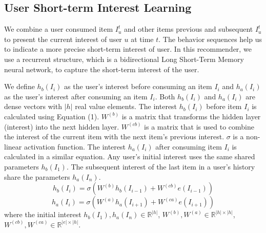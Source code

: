 \documentclass[runningheads]{llncs}
\begin{document}
\subsection{User Short-term Interest Learning}
We combine a user consumed item $I_{u}^{t}$ and other items previous and subsequent $I_{u}^{t}$ to present the current interest of user $u$ at time $t$. The behavior sequences help us to indicate a more precise short-term interest of user. In this recommender, we use a recurrent structure, which is a bidirectional Long Short-Term Memory neural network, to capture the short-term interest of the user.

We define $h_{b}(I_{i})$ as the user's interest before consuming an item $I_{i}$ and $h_{a}(I_{i})$ as the user's interest after consuming an item $I_{i}$. Both $h_{b}(I_{i})$ and $h_{a}(I_{i})$ are dense vectors with $|h|$ real value elements. The interest $h_{b}(I_{i})$ before item $I_{i}$ is calculated using Equation (1). $W^{(b)}$ is a matrix that transforms the hidden layer (interest) into the next hidden layer. $W^{(cb)}$ is a matrix that is used to combine the interest of the current item with the next item's previous interest. $\sigma $ is a non-linear activation function. The interest $h_{a}(I_{i})$ after consuming item $I_{i}$ is calculated in a similar equation. Any user's initial interest uses the same shared parameters $h_{b}(I_{1})$. The subsequent interest of the last item in a user's history share the parameters $h_{a}(I_{n})$.
\begin{equation}
h_{b}(I_{i})=\sigma (W^{(b)}h_{b}(I_{i-1})+W^{(cb)}e(I_{i-1}))
\end{equation}
\begin{equation}
h_{a}(I_{i})=\sigma (W^{(a)}h_{a}(I_{i+1})+W^{(ca)}e(I_{i+1}))
\end{equation}
where the initial interest $h_{b}(I_{1}),h_{a}(I_{n})\in \mathbb{R}^{|h|}$, $W^{(b)},W^{(a)}\in \mathbb{R}^{|h|\times |h|}$, $W^{(cb)},W^{(ca)}\in \mathbb{R}^{|e|\times |h|}$.
\end{document}
